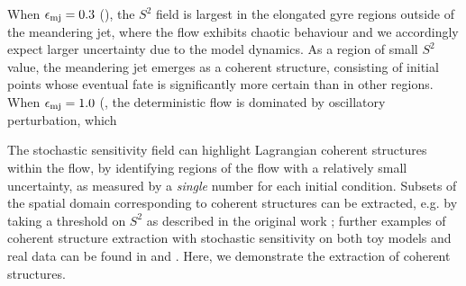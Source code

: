 When \(\epsilon_{\mathrm{mj}} = 0.3\) (), the \(S^2\) field is largest in the elongated gyre regions outside of the meandering jet, where the flow exhibits chaotic behaviour \citep{Pierrehumbert_1991_ChaoticMixingTracer} and we accordingly expect larger uncertainty due to the model dynamics.
As a region of small \(S^2\) value, the meandering jet emerges as a coherent structure, consisting of initial points whose eventual fate is significantly more certain than in other regions.
When \(\epsilon_{\mathrm{mj}} = 1.0\) (, the deterministic flow is dominated by oscillatory perturbation, which

The stochastic sensitivity field can highlight Lagrangian coherent structures within the flow, by identifying regions of the flow with a relatively small uncertainty, as measured by a \emph{single} number for each initial condition.
Subsets of the spatial domain corresponding to coherent structures can be extracted, e.g. by taking a threshold on \(S^2\) as described in the original work \citep{Balasuriya_2020_StochasticSensitivityComputable}; further examples of coherent structure extraction with stochastic sensitivity on both toy models and real data can be found in \citet{Balasuriya_2020_StochasticSensitivityComputable} and \citet{BadzaEtAl_2023_HowSensitiveAre}.
Here, we demonstrate the extraction of coherent structures.



